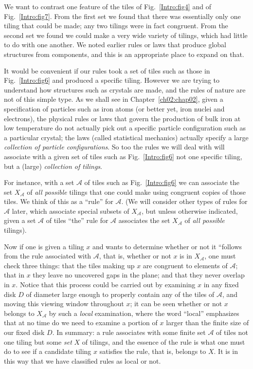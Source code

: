 \documentclass[reqno]{stml-l}
\theoremstyle{plain}
\theoremstyle{definition}
\numberwithin{equation}{chapter}
\begin{document}
We want to contrast one feature of the tiles of Fig.~\ref{Intro:fig4} and of Fig.~\ref{Intro:fig7}. From the first set we found that there was essentially only one tiling that could be made; any two tilings were in fact congruent. From the second set we found we could make a very wide variety of tilings, which had little to do with one another. We noted earlier rules or laws that produce global structures from components, and this is an appropriate place to expand on that.

It would be convenient if our rules took a set of tiles such as those in Fig.~\ref{Intro:fig6} and produced a specific tiling. However we are trying to understand how structures such as crystals are made, and the rules of nature are not of this simple type. As we shall see in Chapter~\ref{ch02:chap02}, given a specification of particles such as iron atoms (or better yet, iron nuclei and electrons), the physical rules or laws that govern the production of bulk iron at low temperature do not actually pick out a specific particle configuration such as a particular crystal; the laws (called statistical mechanics) actually specify a large \emph{collection of particle configurations}. So too the rules we will deal with will associate with a given set of tiles such as Fig.~\ref{Intro:fig6} not one specific tiling, but a (large) \emph{collection of tilings}.

For instance, with a set $\mathcal{A}$ of tiles such as Fig.~\ref{Intro:fig6} we can associate the set $X_{\mathcal{A}}$ of \emph{all possible} tilings that one could make using congruent copies of those tiles. We think of this as a ``rule'' for $\mathcal{A}$. (We will consider other types of rules for $\mathcal{A}$ later, which associate special subsets of $X_{\mathcal{A}}$, but unless otherwise indicated, given a set $\mathcal{A}$ of tiles ``the'' rule for $\mathcal{A}$ associates the set $X_{\mathcal{A}}$ of \emph{all possible} tilings).

Now if one is given a tiling $x$ and wants to determine whether or not it ``follows from the rule associated with $\mathcal{A}$, that is, whether or not $x$ is in $X_{\mathcal{A}}$, one must check three things: that the tiles making up $x$ are congruent to elements of $\mathcal{A}$; that in $x$ they leave no uncovered gaps in the plane; and that they never overlap in $x$. Notice that this process could be carried out by examining $x$ in any fixed disk $D$ of diameter large enough to properly contain any of the tiles of $\mathcal{A}$, and moving this viewing window throughout $x$; it can be seen whether or not $x$ belongs to $X_{\mathcal{A}}$ by such a \emph{local} examination, where the word ``local'' emphasizes that at no time do we need to examine a portion of $x$ larger than the finite size of our fixed disk $D$. In summary: a rule associates with some finite set $\mathcal{A}$ of tiles not one tiling but some \emph{set} $X$ of tilings, and the essence of the rule is what one must do to see if a candidate tiling $x$ satisfies the rule, that is, belongs to $X$. It is in this way that we have classified rules as local or not.
\end{document}
